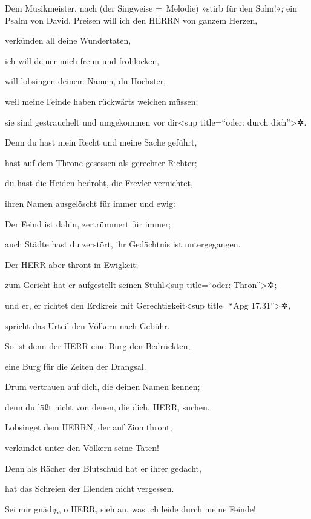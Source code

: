 Dem Musikmeister, nach (der Singweise =~Melodie) »stirb
für den Sohn!«; ein Psalm von David. Preisen will ich den
HERRN von ganzem Herzen,

verkünden all deine Wundertaten,

ich will deiner mich freun und frohlocken,

will lobsingen deinem Namen, du Höchster,

weil meine Feinde haben rückwärts weichen müssen:

sie sind gestrauchelt und umgekommen vor dir\textless sup title=``oder:
durch dich''\textgreater✲.

Denn du hast mein Recht und meine Sache geführt,

hast auf dem Throne gesessen als gerechter Richter;

du hast die Heiden bedroht, die Frevler vernichtet,

ihren Namen ausgelöscht für immer und ewig:

Der Feind ist dahin, zertrümmert für immer;

auch Städte hast du zerstört, ihr Gedächtnis ist untergegangen.

Der HERR aber thront in Ewigkeit;

zum Gericht hat er aufgestellt seinen Stuhl\textless sup title=``oder:
Thron''\textgreater✲;

und er, er richtet den Erdkreis mit
Gerechtigkeit\textless sup title=``Apg 17,31''\textgreater✲,

spricht das Urteil den Völkern nach Gebühr.

So ist denn der HERR eine Burg den Bedrückten,

eine Burg für die Zeiten der Drangsal.

Drum vertrauen auf dich, die deinen Namen kennen;

denn du läßt nicht von denen, die dich, HERR, suchen.

Lobsinget dem HERRN, der auf Zion thront,

verkündet unter den Völkern seine Taten!

Denn als Rächer der Blutschuld hat er ihrer gedacht,

hat das Schreien der Elenden nicht vergessen.

Sei mir gnädig, o HERR, sieh an, was ich leide durch
meine Feinde!

